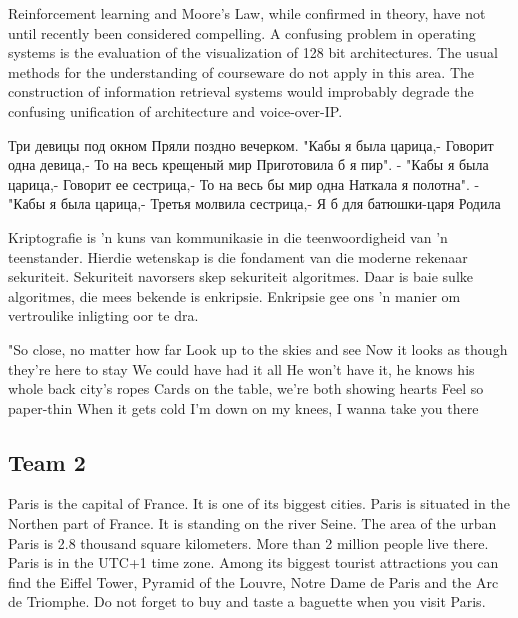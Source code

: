 \documentclass[a4paper,11pt]{article}
\begin{document}
\begin{displayquote}
Reinforcement learning and Moore's Law, while confirmed in theory, have not until recently been considered compelling. A confusing problem in operating systems is the evaluation of the visualization of 128 bit architectures. The usual methods for the understanding of courseware do not apply in this area. The construction of information retrieval systems would improbably degrade the confusing unification of architecture and voice-over-IP.
\end{displayquote}

\begin{displayquote}
Три девицы под окном
Пряли поздно вечерком.
"Кабы я была царица,-
Говорит одна девица,-
То на весь крещеный мир
Приготовила б я пир".
- "Кабы я была царица,-
Говорит ее сестрица,-
То на весь бы мир одна
Наткала я полотна".
- "Кабы я была царица,-
Третья молвила сестрица,-
Я б для батюшки-царя
Родила
\end{displayquote}

\begin{displayquote}
Kriptografie is 'n kuns van kommunikasie in die teenwoordigheid van 'n teenstander. Hierdie wetenskap is die fondament van die moderne rekenaar sekuriteit. Sekuriteit navorsers skep sekuriteit algoritmes. Daar is baie sulke algoritmes, die mees bekende is enkripsie. Enkripsie gee ons 'n manier om vertroulike inligting oor te dra.
\end{displayquote}

\begin{displayquote}
"So close, no matter how far
Look up to the skies and see
Now it looks as though they're here to stay
We could have had it all
He won't have it, he knows his whole back city's ropes
Cards on the table, we're both showing hearts
Feel so paper-thin
When it gets cold
I'm down on my knees, I wanna take you there
\end{displayquote}

\newpage
\subsection{Team 2}
\begin{displayquote}
Paris is the capital of France. It is one of its biggest cities. Paris is situated in the Northen part of France. It is standing on the river Seine.
The area of the urban Paris is 2.8 thousand square kilometers.
More than 2 million people live there.
Paris is in the UTC+1 time zone. Among its biggest tourist attractions you can find
the Eiffel Tower, Pyramid of the Louvre, Notre Dame de Paris and the Arc de Triomphe.
Do not forget to buy and taste a baguette when you visit Paris.
\end{displayquote}
\end{document}
